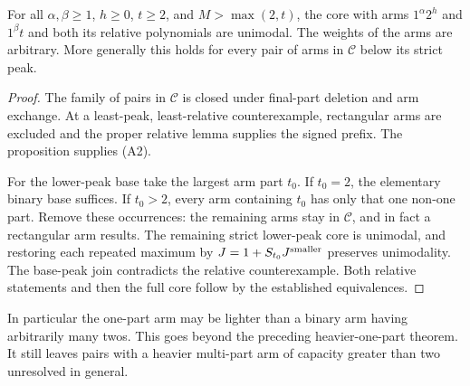 \begin{theorem}
For all $\alpha,\beta\ge1$, $h\ge0$, $t\ge2$, and
$M>\max(2,t)$, the core with arms
$1^\alpha2^h$ and $1^\beta t$ and both its relative
polynomials are unimodal. The weights of the arms are arbitrary.
More generally this holds for every pair of arms in $\mathcal C$
below its strict peak.
\end{theorem}
\begin{proof}
The family of pairs in $\mathcal C$ is closed under final-part
deletion and arm exchange. At a least-peak, least-relative
counterexample, rectangular arms are excluded and the proper
relative lemma supplies the signed prefix. The proposition
supplies (A2).

For the lower-peak base take the largest arm part $t_0$.
If $t_0=2$, the elementary binary base suffices. If $t_0>2$,
every arm containing $t_0$ has only that one non-one part.
Remove these occurrences: the remaining arms stay in
$\mathcal C$, and in fact a rectangular arm results. The
remaining strict lower-peak core is unimodal, and restoring
each repeated maximum by $J=1+S_{t_0}J^{\rm smaller}$
preserves unimodality. The base-peak join contradicts the
relative counterexample. Both relative statements and then
the full core follow by the established equivalences.
\end{proof}

In particular the one-part arm may be lighter than a binary arm
having arbitrarily many twos. This goes beyond the preceding
heavier-one-part theorem. It still leaves pairs with a heavier
multi-part arm of capacity greater than two unresolved in general.
